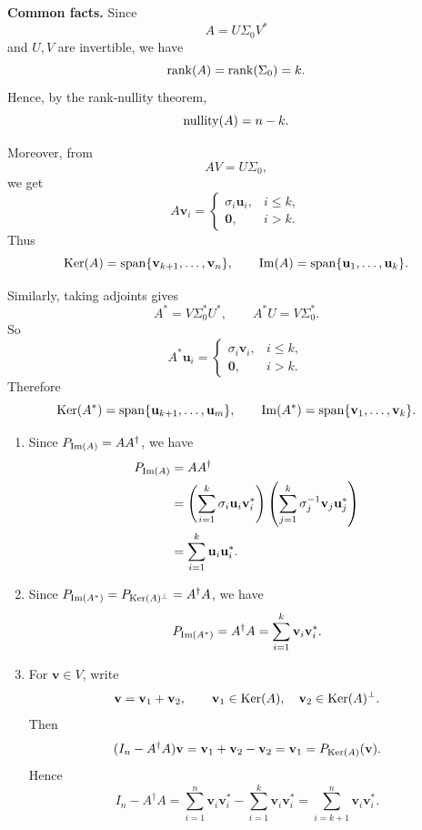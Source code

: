 \begin{pfbox}
\textbf{Common facts.}
Since
\[
A=U\Sigma_0V^*
\]
and $U,V$ are invertible, we have
\[
\operatorname{rank}(A)=\operatorname{rank}(\Sigma_0)=k.
\]
Hence, by the rank-nullity theorem,
\[
\operatorname{nullity}(A)=n-k.
\]

Moreover, from
\[
AV=U\Sigma_0,
\]
we get
\[
A\mathbf{v}_i=
\begin{cases}
\sigma_i\mathbf{u}_i, & i\le k,\\
\mathbf{0}, & i>k.
\end{cases}
\]
Thus
\[
\operatorname{Ker}(A)=\operatorname{span}\{\mathbf{v}_{k+1},\dots,\mathbf{v}_n\},
\qquad
\operatorname{Im}(A)=\operatorname{span}\{\mathbf{u}_1,\dots,\mathbf{u}_k\}.
\]

Similarly, taking adjoints gives
\[
A^*=V\Sigma_0^*U^*,
\qquad
A^*U=V\Sigma_0^*.
\]
So
\[
A^*\mathbf{u}_i=
\begin{cases}
\sigma_i\mathbf{v}_i, & i\le k,\\
\mathbf{0}, & i>k.
\end{cases}
\]
Therefore
\[
\operatorname{Ker}(A^*)=\operatorname{span}\{\mathbf{u}_{k+1},\dots,\mathbf{u}_m\},
\qquad
\operatorname{Im}(A^*)=\operatorname{span}\{\mathbf{v}_1,\dots,\mathbf{v}_k\}.
\]

\begin{enumerate}
    \item[(i)]
    Since $P_{\operatorname{Im}(A)}=AA^\dagger$, we have
    \begin{align*}
    P_{\operatorname{Im}(A)}
    &=
    AA^\dagger \\
    &=
    \left(\sum_{i=1}^k \sigma_i\mathbf{u}_i\mathbf{v}_i^*\right)
    \left(\sum_{j=1}^k \sigma_j^{-1}\mathbf{v}_j\mathbf{u}_j^*\right) \\
    &=
    \sum_{i=1}^k \mathbf{u}_i\mathbf{u}_i^*.
    \end{align*}

    \item[(j)]
    Since $P_{\operatorname{Im}(A^*)}=P_{\operatorname{Ker}(A)^\perp}=A^\dagger A$, we have
    \[
    P_{\operatorname{Im}(A^*)}
    =
    A^\dagger A
    =
    \sum_{i=1}^k \mathbf{v}_i\mathbf{v}_i^*.
    \]

    \item[(k)]
    For $\mathbf{v}\in V$, write
    \[
    \mathbf{v}=\mathbf{v}_1+\mathbf{v}_2,
    \qquad
    \mathbf{v}_1\in\operatorname{Ker}(A),
    \quad
    \mathbf{v}_2\in\operatorname{Ker}(A)^\perp.
    \]
    Then
    \[
    (I_n-A^\dagger A)\mathbf{v}
    =
    \mathbf{v}_1+\mathbf{v}_2-\mathbf{v}_2
    =
    \mathbf{v}_1
    =
    P_{\operatorname{Ker}(A)}(\mathbf{v}).
    \]
    Hence
    \[
    I_n-A^\dagger A
    =
    \sum_{i=1}^n \mathbf{v}_i\mathbf{v}_i^*
    -
    \sum_{i=1}^k \mathbf{v}_i\mathbf{v}_i^*
    =
    \sum_{i=k+1}^n \mathbf{v}_i\mathbf{v}_i^*.
    \]


\end{enumerate}
\end{pfbox}
